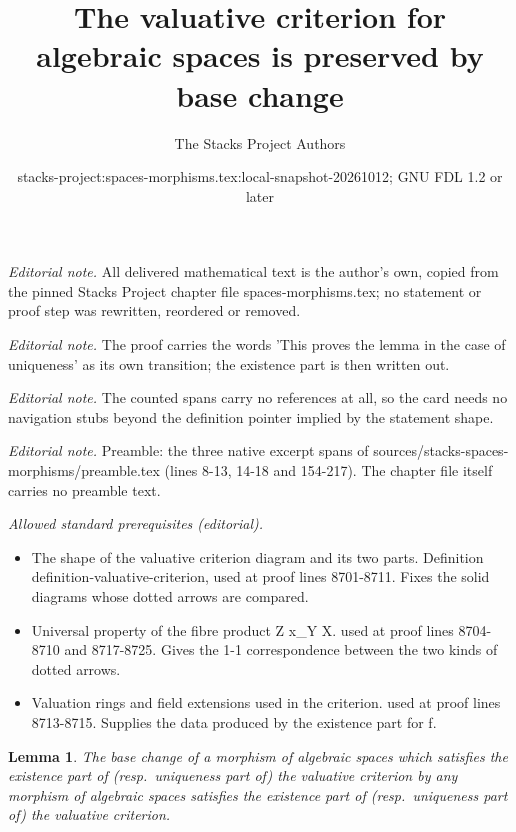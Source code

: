 \documentclass[10pt,a4paper]{amsart}
\title{The valuative criterion for algebraic spaces is preserved by base change}
\author{The Stacks Project Authors}
\date{stacks-project:spaces-morphisms.tex:local-snapshot-20261012; GNU FDL 1.2 or later}
\theoremstyle{plain}
\newtheorem{lemma}[subsection]{Lemma}
\theoremstyle{definition}
\theoremstyle{remark}
\numberwithin{equation}{subsection}
\begin{document}
\maketitle
\setcounter{subsection}{1}
\noindent\textit{Editorial note.} All delivered mathematical text is the author's own, copied from the pinned Stacks Project chapter file spaces-morphisms.tex; no statement or proof step was rewritten, reordered or removed.\par\medskip
\noindent\textit{Editorial note.} The proof carries the words 'This proves the lemma in the case of uniqueness' as its own transition; the existence part is then written out.\par\medskip
\noindent\textit{Editorial note.} The counted spans carry no references at all, so the card needs no navigation stubs beyond the definition pointer implied by the statement shape.\par\medskip
\noindent\textit{Editorial note.} Preamble: the three native excerpt spans of sources/stacks-spaces-morphisms/preamble.tex (lines 8-13, 14-18 and 154-217). The chapter file itself carries no preamble text.\par\medskip
\noindent\textit{Allowed standard prerequisites (editorial).}\begin{itemize}
\item The shape of the valuative criterion diagram and its two parts. Definition definition-valuative-criterion, used at proof lines 8701-8711. Fixes the solid diagrams whose dotted arrows are compared.
\item Universal property of the fibre product Z x\_Y X. used at proof lines 8704-8710 and 8717-8725. Gives the 1-1 correspondence between the two kinds of dotted arrows.
\item Valuation rings and field extensions used in the criterion. used at proof lines 8713-8715. Supplies the data produced by the existence part for f.
\end{itemize}\medskip
\begin{lemma}
\label{lemma-base-change-valuative-criteria}
The base change of a morphism of algebraic spaces which satisfies the
existence part of (resp.\ uniqueness part of) the valuative criterion
by any morphism of algebraic spaces satisfies the
existence part of (resp.\ uniqueness part of) the valuative criterion.
\end{lemma}
\end{document}

